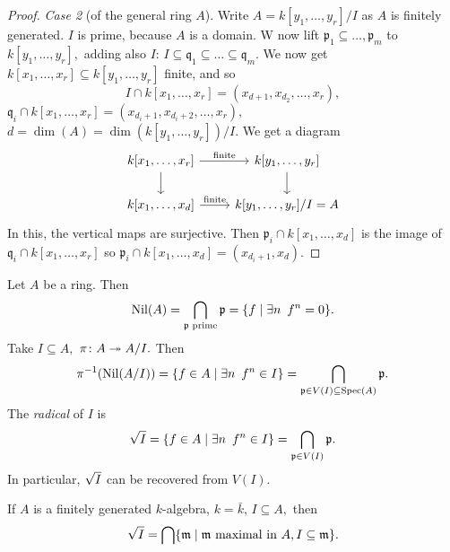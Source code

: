 \begin{proof}
  \emph{Case 2} (of the general ring \(A\)).
  Write
  \(A = k[y_1, \dotsc, y_r]/{I}\)
  as \(A\) is finitely generated.
  \(I\) is prime, because \(A\) is a domain.
  W now lift
  \(\mathfrak p_1 \subseteq \dotsc, \mathfrak p_m\)
  to \(k[y_1, \dotsc, y_r],\) adding also \(I\):
  \(I \subseteq \mathfrak q_1 \subseteq \dotso \subseteq \mathfrak q_m.\)
  We now get
  \(k[x_1, \dotsc, x_r] \subseteq k[y_1, \dotsc, y_r]\) finite, and so
  \[I \cap k[x_1, \dotsc, x_r] = (x_{d+1}, x_{d_2}, \dotsc, x_r),\]
  \(\mathfrak q_i \cap k[x_1, \dotsc, x_r] = (x_{d_i+1}, x_{d_i+2}, \dotsc, x_r),\)
  \(d = \dim(A) = \dim(k[y_1, \dotsc, y_r])/{I}.\)
  We get a diagram
  \begin{equation*}
    \begin{tikzcd}
      k[x_1, \dotsc, x_r] \arrow{r}{\text{finite}} \arrow{d}
      & k[y_1, \dotsc, y_r] \arrow{d} \\
      k[x_1, \dotsc, x_d] \arrow{r}{\text{finite}}
      & k[y_1, \dotsc, y_r]/{I} = A
    \end{tikzcd}
  \end{equation*}
  In this, the vertical maps are surjective.
  Then
  \(\mathfrak p_i \cap k[x_1, \dotsc, x_d]\) is the image of \(\mathfrak q_i \cap k[x_1, \dotsc, x_r]\)
  so
  \(\mathfrak p_i \cap k[x_1, \dotsc, x_d] = (x_{d_i+1}, x_{d}).\)
\end{proof}


\begin{note}
  Let \(A\) be a ring. Then
  \[\operatorname{Nil}(A) = \bigcap_{\mathfrak p \text{ prime}} \mathfrak p = \{f \mathrel{|} \exists n \enspace f^n = 0\}.\]
  Take \(I \subseteq A,\) \(\pi \colon A \twoheadrightarrow A/{I}.\)
  Then
  \[\pi^{-1}(\operatorname{Nil}(A/{I})) = \{f \in A \mathrel{|} \exists n \enspace f^n \in I\} = \bigcap_{\mathfrak p \in V(I) \subseteq \text{Spec}(A)} \mathfrak p.\]
  The \emph{radical} of \(I\) is
  \[\sqrt{I} = \{f \in A \mathrel{|} \exists n \enspace f^n \in I\} = \bigcap_{\mathfrak p \in V(I)} \mathfrak p.\]
  In particular, \(\sqrt{I}\) can be recovered from \(V(I).\)
\end{note}

\begin{theorem}[Nullstellensatz]
  \label{Nullstellensatz}
  If \(A\) is a finitely generated \(k\)-algebra, \(k = \bar k\), \(I \subseteq A,\) then
  \[\sqrt{I} = \bigcap \{\mathfrak m \mathrel{|} \mathfrak m \text{ maximal in \(A\)}, I \subseteq \mathfrak{ m}\}.\]
\end{theorem}

